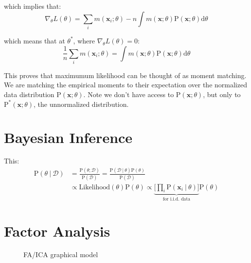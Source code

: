 \documentclass{article}
\newcommand{\prob}{\text{P}}
\renewcommand{\vec}[1]{\mathbf{#1}}
\newcommand{\bx}{\vec{x}}
\newcommand{\giv}{\ |\ }
\begin{document}
which implies that:
\begin{equation*}
    \nabla_\theta L(\theta) = \sum_i m(\bx_i; \theta) - n \int m(\bx; \theta) \prob(\bx; \theta) \text{d} \theta
\end{equation*}

which means that at $\theta^*$, where $\nabla_\theta L(\theta) = 0$:
\begin{equation*}
    \frac{1}{n} \sum_i m(\bx_i; \theta) = \int m(\bx; \theta) \prob(\bx; \theta) \text{d} \theta
\end{equation*}

This proves that maximumum likelihood can be thought of as moment matching. We are matching the empirical moments to their expectation over the normalized data distribution $\prob(\bx; \theta)$. Note we don't have access to $\prob(\bx; \theta)$, but only to $\prob^*(\bx; \theta)$, the unnormalized distribution.

\section{Bayesian Inference}
This:
\begin{align*}
    \prob(\theta \giv \mathcal{D}) &= \frac{
        \prob(\theta; \mathcal{D})
    } {
        \prob(\mathcal{D})
    } = \frac{
        \prob(\mathcal{D} \giv \theta) \prob(\theta)
    } {
        \prob(\mathcal{D})
    } \\
    &\propto \text{Likelihood}(\theta) \prob(\theta) \propto \underbrace{\bigg[
        \prod_i \prob(\bx_i \giv \theta)
    \bigg]}_{\text{for i.i.d. data}} \prob(\theta)
\end{align*}

\section{Factor Analysis}
\begin{figure}
    \centering
    \caption{FA/ICA graphical model}
    \label{fig:fa_ica}
\end{figure}
\end{document}
